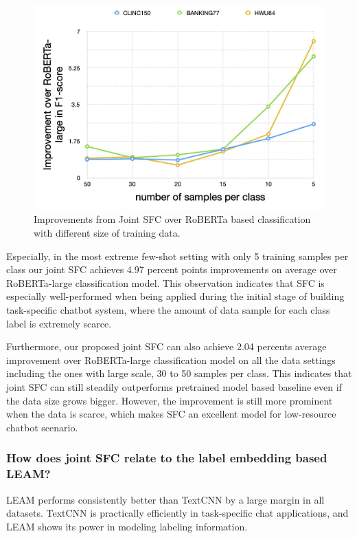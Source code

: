 \begin{figure}[t]
  \begin{centering}
    \includegraphics[scale=0.2]{picture/improvement_trend.jpg} 
    \par
  \end{centering}
  \caption{
    Improvements  from  Joint  SFC  over  RoBERTa  based  classification  with
    different size of training data.
  }
  \label{fig:trend}
\end{figure}

Especially,  in the most extreme few-shot setting with only 5 training samples
per  class  our joint SFC achieves 4.97 percent points improvements on average
over  RoBERTa-large classification model. This observation indicates that SFC
is  especially  well-performed  when being applied during the initial stage of
building  task-specific  chatbot  system,  where the amount of data sample for
each class label is extremely scarce.

Furthermore,  our  proposed  joint  SFC can also achieve 2.04 percents average
improvement  over  RoBERTa-large classification model on all the data settings
including  the  ones  with  large  scale,  30  to  50  samples per class. This
indicates that joint SFC can still steadily outperforms pretrained model based
baseline even if the data size grows bigger. However, the improvement is still
more prominent when the data is scarce, which makes SFC an excellent model for
low-resource chatbot scenario.

\subsubsection*{How does joint SFC relate to the label  embedding based  LEAM?}
LEAM performs consistently better than TextCNN by a large margin in all
datasets. TextCNN is practically efficiently in task-specific chat
applications, and LEAM shows its power in modeling labeling information.

